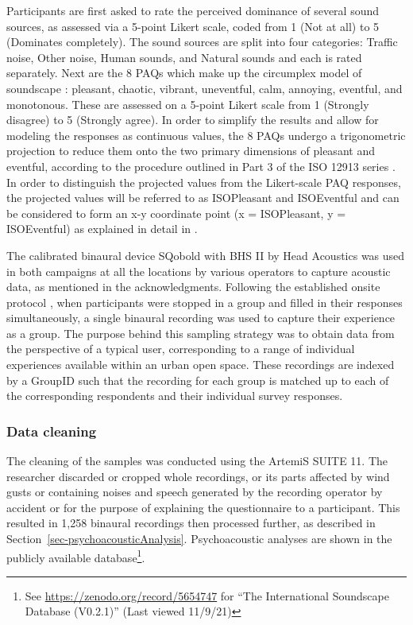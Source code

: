 \documentclass[
  authoryear,
  preprint,
  3p,
  onecolumn]{elsarticle}
\begin{document}
Participants are first asked to rate the perceived dominance of several
sound sources, as assessed via a 5-point Likert scale, coded from 1 (Not
at all) to 5 (Dominates completely). The sound sources are split into
four categories: Traffic noise, Other noise, Human sounds, and Natural
sounds and each is rated separately. Next are the 8 PAQs which make up
the circumplex model of soundscape \citep{Axelsson2010principal}:
pleasant, chaotic, vibrant, uneventful, calm, annoying, eventful, and
monotonous. These are assessed on a 5-point Likert scale from 1
(Strongly disagree) to 5 (Strongly agree). In order to simplify the
results and allow for modeling the responses as continuous values, the 8
PAQs undergo a trigonometric projection to reduce them onto the two
primary dimensions of pleasant and eventful, according to the procedure
outlined in Part 3 of the ISO 12913 series \citep{ISO12913Part3}. In
order to distinguish the projected values from the Likert-scale PAQ
responses, the projected values will be referred to as ISOPleasant and
ISOEventful and can be considered to form an x-y coordinate point (x =
ISOPleasant, y = ISOEventful) as explained in detail in
\citet{Lionello2021Introducing}.

The calibrated binaural device SQobold with BHS II by Head Acoustics was
used in both campaigns at all the locations by various operators to
capture acoustic data, as mentioned in the acknowledgments. Following
the established onsite protocol \citep{Mitchell2020Soundscape}, when
participants were stopped in a group and filled in their responses
simultaneously, a single binaural recording was used to capture their
experience as a group. The purpose behind this sampling strategy was to
obtain data from the perspective of a typical user, corresponding to a
range of individual experiences available within an urban open space.
These recordings are indexed by a GroupID such that the recording for
each group is matched up to each of the corresponding respondents and
their individual survey responses.

\subsubsection{Data cleaning}\label{data-cleaning}

The cleaning of the samples was conducted using the ArtemiS SUITE 11.
The researcher discarded or cropped whole recordings, or its parts
affected by wind gusts or containing noises and speech generated by the
recording operator by accident or for the purpose of explaining the
questionnaire to a participant. This resulted in 1,258 binaural
recordings then processed further, as described in
Section~\ref{sec-psychoacousticAnalysis}. Psychoacoustic analyses are
shown in the publicly available database\footnote{See
  \url{https://zenodo.org/record/5654747} for ``The International
  Soundscape Database (V0.2.1)'' (Last viewed 11/9/21)}.
\end{document}
